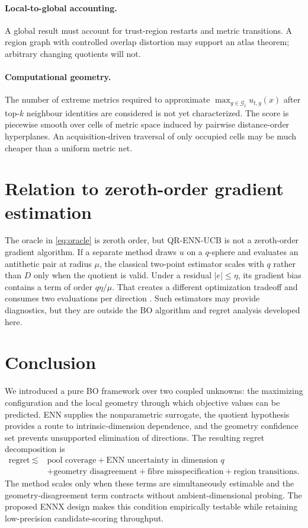 \documentclass[11pt]{article}
\theoremstyle{definition}
\theoremstyle{remark}
\newcommand{\Gg}{\mathcal G}
\newcommand{\1}{\mathbf 1}
\begin{document}
\paragraph{Local-to-global accounting.}
A global result must account for trust-region restarts and metric transitions.  A region graph with
controlled overlap distortion may support an atlas theorem; arbitrary changing quotients will not.

\paragraph{Computational geometry.}
The number of extreme metrics required to approximate
$\max_{g\in\Gg_t}u_{t,g}(x)$ after top-$k$ neighbour identities are considered is not yet
characterized.  The score is piecewise smooth over cells of metric space induced by
pairwise distance-order hyperplanes.  An
acquisition-driven traversal of only occupied cells may be much cheaper than a uniform metric net.

\section{Relation to zeroth-order gradient estimation}\label{sec:zoo-boundary}

The oracle in \eqref{eq:oracle} is zeroth order, but QR-ENN-UCB is not a zeroth-order gradient
algorithm.  If a separate method draws $u$ on a $q$-sphere and evaluates an antithetic pair at radius
$\mu$, the classical two-point estimator scales with $q$ rather than $D$ only when the quotient is
valid.  Under a residual $|e|\le\eta$, its gradient bias contains a term of order $q\eta/\mu$.
That creates a different optimization tradeoff and consumes two evaluations per direction
\cite{Duchi,Shamir}.  Such estimators may provide diagnostics, but they are outside the BO algorithm
and regret analysis developed here.

\section{Conclusion}

We introduced a pure BO framework over two coupled unknowns: the maximizing configuration and the
local geometry through which objective values can be predicted.  ENN supplies the nonparametric
surrogate, the quotient hypothesis provides a route to intrinsic-dimension dependence, and the
geometry confidence set prevents unsupported elimination of directions.  The resulting regret
decomposition is
\begin{align*}
  \text{regret}\ \lesssim\;&
  \text{pool coverage}+\text{ENN uncertainty in dimension }q\\
  &+\text{geometry disagreement}+\text{fibre misspecification}
  +\text{region transitions}.
\end{align*}
The method scales only when these terms are simultaneously estimable and the geometry-disagreement
term contracts without ambient-dimensional probing.  The proposed ENNX design makes this
condition empirically testable while retaining low-precision candidate-scoring throughput.
\end{document}
